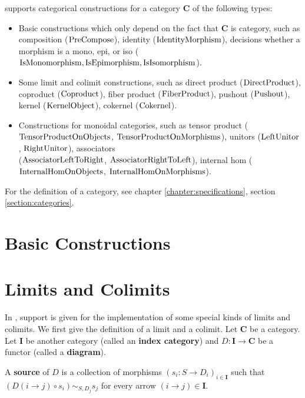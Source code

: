 \CapPkg supports categorical constructions 
for a category $\mathbf{C}$
of the following types:

\begin{itemize}
 \item Basic constructions which only depend on the fact that $\mathbf{C}$ is category,
 such as composition ($\mathrm{PreCompose}$), identity ($\mathrm{IdentityMorphism}$), decisions whether
 a morphism is a mono, epi, or iso ($\mathrm{IsMonomorphism}, \mathrm{IsEpimorphism}, \mathrm{IsIsomorphism}$).
 \item Some limit and colimit constructions, such as direct product ($\mathrm{DirectProduct}$),
 coproduct ($\mathrm{Coproduct}$), fiber product ($\mathrm{FiberProduct}$), pushout ($\mathrm{Pushout}$),
 kernel ($\mathrm{KernelObject}$), cokernel ($\mathrm{Cokernel}$).
 \item Constructions for monoidal categories, such as tensor product ($\mathrm{TensorProductOnObjects}$, $\mathrm{TensorProductOnMorphisms}$),
 unitors ($\mathrm{LeftUnitor}$, $\mathrm{RightUnitor}$), associators \\($\mathrm{AssociatorLeftToRight}$, $\mathrm{AssociatorRightToLeft}$),
 internal hom ($\mathrm{InternalHomOnObjects}$, $\mathrm{InternalHomOnMorphisms}$).
\end{itemize}

\begin{notation}
 For the definition of a category, see chapter \ref{chapter:specifications}, section \ref{section:categories}.
\end{notation}


\section{Basic Constructions}

\section{Limits and Colimits}\label{section:universalobjects}

In \CapPkg, support is given for the implementation of some special kinds of limits and
colimits. We first give the definition of a limit and a colimit.
Let $\mathbf{C}$ be a category. Let $\mathbf{I}$ be another category (called an \textbf{index category}) and $D: \mathbf{I} \rightarrow \mathbf{C}$
be a functor (called a \textbf{diagram}). 
\begin{definition} 
 A \textbf{source} of $D$ is a collection of morphisms $( s_i: S \rightarrow D_i)_{i \in \mathbf{I}}$ such that
 $\left( D( i \rightarrow j ) \circ s_i \right) \sim_{S,D_j} s_j$ for every arrow $(i \rightarrow j) \in \mathbf{I}$.
\end{definition}
 
